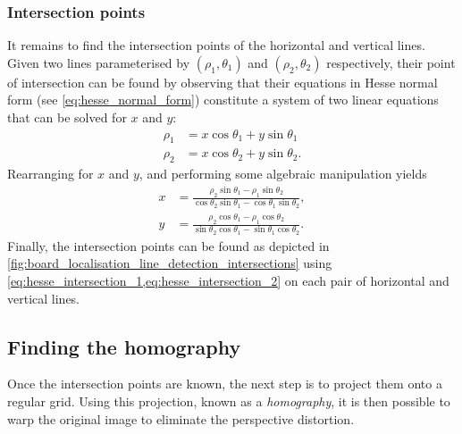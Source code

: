 \documentclass[../report.tex]{subfiles}
\begin{document}
\subsubsection{Intersection points}
It remains to find the intersection points of the horizontal and vertical lines.
Given two lines parameterised by $(\rho_1,\theta_1)$ and $(\rho_2,\theta_2)$ respectively, their point of intersection can be found by observing that their equations in Hesse normal form (see \cref{eq:hesse_normal_form}) constitute a system of two linear equations that can be solved for $x$ and $y$:
\begin{align*}
    \rho_1 &= x \cos \theta_1 + y \sin \theta_1 \\
    \rho_2 &= x \cos \theta_2 + y \sin \theta_2.
\end{align*}
Rearranging for $x$ and $y$, and performing some algebraic manipulation yields
\begin{align}
    \label{eq:hesse_intersection_1}
    x &= \frac{\rho_2 \sin \theta_1 - \rho_1 \sin \theta_2}{\cos \theta_2 \sin \theta_1 - \cos \theta_1 \sin \theta_2}, \\
    \label{eq:hesse_intersection_2}
    y &= \frac{\rho_2 \cos \theta_1 - \rho_1 \cos \theta_2}{\sin \theta_2 \cos \theta_1 - \sin \theta_1 \cos \theta_2}.
\end{align}
Finally, the intersection points can be found as depicted in \cref{fig:board_localisation_line_detection_intersections} using \cref{eq:hesse_intersection_1,eq:hesse_intersection_2} on each pair of horizontal and vertical lines.

\subsection{Finding the homography}
\label{sec:find_homography}
Once the intersection points are known, the next step is to project them onto a regular grid. 
Using this projection, known as a \emph{homography}, it is then possible to warp the original image to eliminate the perspective distortion. 
\end{document}
